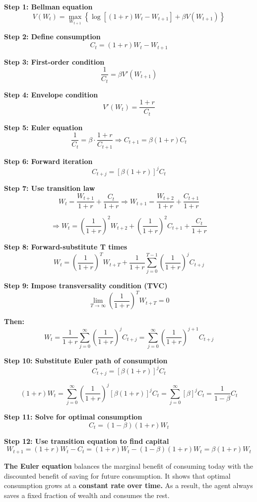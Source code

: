 \documentclass[12pt]{article}
\begin{document}
{\color{blue}

\textbf{Step 1: Bellman equation}
\[
V(W_t) = \max_{W_{t+1}} \left\{ \log\left[(1 + r)W_t - W_{t+1} \right] + \beta V(W_{t+1}) \right\}
\]

\textbf{Step 2: Define consumption}
\[
C_t = (1 + r)W_t - W_{t+1}
\]

\textbf{Step 3: First-order condition}
\[
\frac{1}{C_t} = \beta V'(W_{t+1})
\]

\textbf{Step 4: Envelope condition}
\[
V'(W_t) = \frac{1 + r}{C_t}
\]

\textbf{Step 5: Euler equation}
\[
\frac{1}{C_t} = \beta \cdot \frac{1 + r}{C_{t+1}} \Rightarrow C_{t+1} = \beta(1 + r) C_t
\]

\textbf{Step 6: Forward iteration}
\[
C_{t+j} = \left[ \beta(1 + r) \right]^j C_t
\]

\textbf{Step 7: Use transition law}
\[
W_t = \frac{W_{t+1}}{1 + r} + \frac{C_t}{1 + r}
\Rightarrow W_{t+1} = \frac{W_{t+2}}{1 + r} + \frac{C_{t+1}}{1 + r}
\]

\[
\Rightarrow W_t = \left( \frac{1}{1 + r} \right)^2 W_{t+2}
+ \left( \frac{1}{1 + r} \right)^2 C_{t+1}
+ \frac{C_t}{1 + r}
\]

\textbf{Step 8: Forward-substitute T times}
\[
W_t = \left( \frac{1}{1 + r} \right)^T W_{t+T}
+ \frac{1}{1 + r} \sum_{j=0}^{T-1} \left( \frac{1}{1 + r} \right)^j C_{t+j}
\]

\textbf{Step 9: Impose transversality condition (TVC)}
\[
\lim_{T \to \infty} \left( \frac{1}{1 + r} \right)^T W_{t+T} = 0
\]

\textbf{Then:}
\[
W_t = \frac{1}{1 + r} \sum_{j=0}^{\infty} \left( \frac{1}{1 + r} \right)^j C_{t+j}
= \sum_{j=0}^{\infty} \left( \frac{1}{1 + r} \right)^{j+1} C_{t+j}
\]

\textbf{Step 10: Substitute Euler path of consumption}
\[
C_{t+j} = \left[ \beta(1 + r) \right]^j C_t
\]

\[
(1 + r)W_t = \sum_{j=0}^{\infty} \left( \frac{1}{1 + r} \right)^j \left[ \beta(1 + r) \right]^j C_t
= \sum_{j=0}^{\infty} \left[ \beta \right]^j C_t
= \frac{1}{1 - \beta} C_t
\]

\textbf{Step 11: Solve for optimal consumption}
\[
C_t = (1 - \beta)(1 + r)W_t
\]

\textbf{Step 12: Use transition equation to find capital}
\[
W_{t+1} = (1 + r)W_t - C_t = (1 + r)W_t - (1 - \beta)(1 + r)W_t = \beta(1 + r)W_t
\]

}

\textbf{The Euler equation} balances the marginal benefit of consuming today with the discounted benefit of saving for future consumption.
It shows that optimal consumption grows at a \textbf{constant rate over time.}
As a result, the agent always saves a fixed fraction of wealth and consumes the rest.
\end{document}
